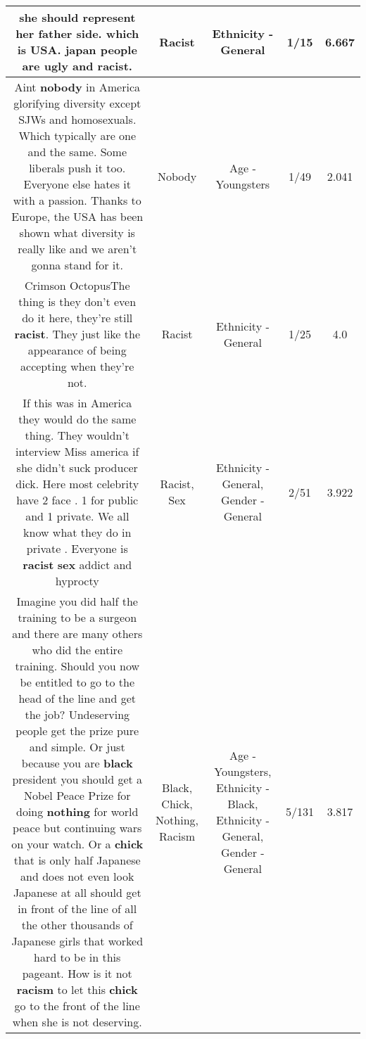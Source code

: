 \documentclass[11pt]{article}
\newlength\mylength
\begin{document}
\begin{center}
\begin{longtable}{|C{.65\mylength}|C{.30\mylength}|C{.12\mylength}|C{.12\mylength}|C{.12\mylength}|}
  \small she should represent her father side. which is USA. japan people are ugly and \textbf{racist}.\normalsize   & Racist & Ethnicity - General & 1/15 & 6.667 \\  \hline
  \small Aint \textbf{nobody} in America glorifying diversity except SJWs and homosexuals. Which typically are one and the same. Some liberals push it too. Everyone else hates it with a passion. Thanks to Europe, the USA has been shown what diversity is really like and we aren't gonna stand for it.\normalsize   & Nobody & Age - Youngsters & 1/49 & 2.041 \\  \hline
  \small Crimson OctopusThe thing is they don't even do it here, they're still \textbf{racist}. They just like the appearance of being accepting when they're not.\normalsize   & Racist & Ethnicity - General & 1/25 & 4.0 \\  \hline
  \small If this was in America they would do the same thing. They wouldn't interview Miss america if she didn't suck producer dick. Here most celebrity have 2 face . 1 for public and 1 private. We all know what they do in private . Everyone is \textbf{racist} \textbf{sex} addict and hyprocty\normalsize   & Racist, Sex & Ethnicity - General, Gender - General & 2/51 & 3.922 \\  \hline
  \small Imagine you did half the training to be a surgeon and there are many others who did the entire training.  Should you now be entitled to go to the head of the line and get the job?  Undeserving people get the prize pure and simple.  Or just because you are \textbf{black} president you should get a Nobel Peace Prize for doing \textbf{nothing} for world peace but continuing wars on your watch.  Or a \textbf{chick} that is only half Japanese and does not even look Japanese at all should get in front of the line of all the other thousands of Japanese girls that worked hard to be in this pageant.  How is it not \textbf{racism} to let this \textbf{chick} go to the front of the line when she is not deserving.\normalsize   & Black, Chick, Nothing, Racism & Age - Youngsters, Ethnicity - Black, Ethnicity - General, Gender - General & 5/131 & 3.817 \\  \hline

\end{longtable}
\end{center}
\end{document}
